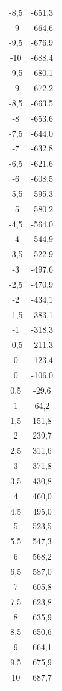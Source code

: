 \begin{table}
\begin{tabular}{c c}
    -8,5  &-651,3 \\
    -9    &-664,6 \\
    -9,5  &-676,9 \\
    -10   &-688,4 \\
    -9,5  &-680,1 \\
    -9    &-672,2 \\
    -8,5  &-663,5 \\
    -8    &-653,6 \\
    -7,5  &-644,0 \\
    -7    &-632,8 \\
    -6,5  &-621,6 \\
    -6    &-608,5 \\
    -5,5  &-595,3 \\
    -5    &-580,2 \\
    -4,5  &-564,0 \\
    -4    &-544,9 \\
    -3,5  &-522,9 \\
    -3    &-497,6 \\
    -2,5  &-470,9 \\
    -2    &-434,1 \\
    -1,5  &-383,1 \\
    -1    &-318,3 \\
    -0,5  &-211,3 \\
    0     &-123,4 \\
    0     &-106,0 \\
    0,5   & -29,6 \\
    1     &  64,2 \\
    1,5   & 151,8 \\
    2     & 239,7 \\
    2,5   & 311,6 \\
    3     & 371,8 \\
    3,5   & 430,8 \\
    4     & 460,0 \\
    4,5   & 495,0 \\
    5     & 523,5 \\
    5,5   & 547,3 \\
    6     & 568,2 \\
    6,5   & 587,0 \\
    7     & 605,8 \\
    7,5   & 623,8 \\
    8     & 635,9 \\
    8,5   & 650,6 \\
    9     & 664,1 \\
    9,5   & 675,9 \\
    10    & 687,7 \\
    \bottomrule
  \end{tabular}
\end{table}

